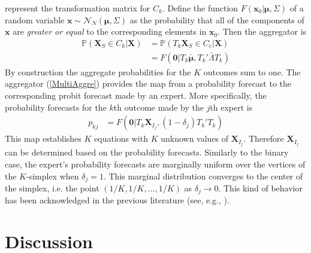 \documentclass[11pt,twoside]{article}
\renewcommand{\P}{\mathbb{P}}
\theoremstyle{definition}
\theoremstyle{definition}
\begin{document}
represent the transformation matrix for $C_k$. Define the function $F(\boldsymbol{x}_0 | \boldsymbol{\mu}, \Sigma)$ of a random variable $\boldsymbol{x} \sim \mathcal{N}_N(\boldsymbol{\mu}, \Sigma)$ as the probability that all of the components of $\boldsymbol{x}$ are \textit{greater or equal} to the corresponding elements in $\boldsymbol{x}_0$. Then the aggregator is 
\begin{align}
\P(\boldsymbol{X}_S \in C_k | \boldsymbol{X}) &= \P(T_k \boldsymbol{X}_S \in C_e | \boldsymbol{X}) \nonumber\\
&= F(\boldsymbol{0} | T_k\boldsymbol{\bar{\mu}}, T_k' \bar{\Lambda}T_k) \label{MultiAggre}
\end{align}
By construction the aggregate probabilities for the $K$ outcomes sum to one. The aggregator (\ref{MultiAggre}) provides the map from a probability forecast to the corresponding probit forecast made by an expert. More specifically, the probability forecasts for the $k$th outcome made by the $j$th expert is
\begin{align*}
p_{kj}&= F(\boldsymbol{0} | T_k\boldsymbol{X}_{I_j}, (1-\delta_j)T_k'T_k)
\end{align*}
This map establishes $K$ equations with $K$ unknown values of $\boldsymbol{X}_{I_j}$. Therefore $\boldsymbol{X}_{I_j}$ can be determined based on the probability forecasts. Similarly to the binary case, the expert's probability forecasts are marginally uniform over the vertices of the $K$-simplex when $\delta_j = 1$. This marginal distribution converges to the center of the simplex, i.e. the point $(1/K, 1/K, \dots, 1/K)$ as $\delta_j \to 0$. This kind of behavior has been acknowledged in the previous literature (see, e.g., \cite{fox2003partition, see2006between, satopaa}).



\section{Discussion}

\end{document}
